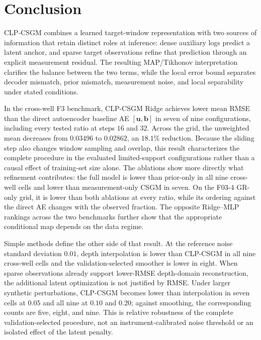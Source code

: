 \section{Conclusion}
\label{sec:conclusion}

CLP-CSGM combines a learned target-window representation with two sources of
information that retain distinct roles at inference: dense auxiliary logs
predict a latent anchor, and sparse target observations refine that prediction
through an explicit measurement residual. The resulting MAP/Tikhonov
interpretation clarifies the balance between the two terms, while the local
error bound separates decoder mismatch, prior mismatch, measurement noise,
and local separability under stated conditions.

In the cross-well F3 benchmark, CLP-CSGM Ridge achieves lower mean RMSE than
the direct autoencoder baseline AE
$[\boldsymbol{u},\boldsymbol{b}]$ in seven of nine configurations, including
every tested ratio at steps $16$ and $32$. Across the grid, the unweighted
mean decreases from $0.03496$ to $0.02862$, an $18.1\%$ reduction. Because
the sliding step also changes window sampling and overlap, this result
characterizes the complete procedure in the evaluated limited-support
configurations rather than a causal effect of training-set size alone. The
ablations show more directly what refinement contributes: the full model is
lower than prior-only in all
nine cross-well cells and lower than measurement-only CSGM in seven. On the
F03-4 GR-only grid, it is lower than both ablations at every ratio, while its
ordering against the direct AE changes with the observed fraction. The
opposite Ridge--MLP rankings across the two benchmarks further show that the
appropriate conditional map depends on the data regime.

Simple methods define the other side of that result. At the reference noise
standard deviation $0.01$, depth interpolation is lower than CLP-CSGM in all
nine cross-well cells and the validation-selected smoother is lower in eight.
When sparse observations already support lower-RMSE depth-domain
reconstruction, the additional latent optimization is not justified by RMSE.
Under larger synthetic perturbations, CLP-CSGM becomes lower than
interpolation in seven cells at $0.05$ and all nine at $0.10$ and $0.20$;
against smoothing, the corresponding counts are five, eight, and nine. This
is relative robustness of the complete validation-selected procedure, not an
instrument-calibrated noise threshold or an isolated effect of the latent
penalty.


